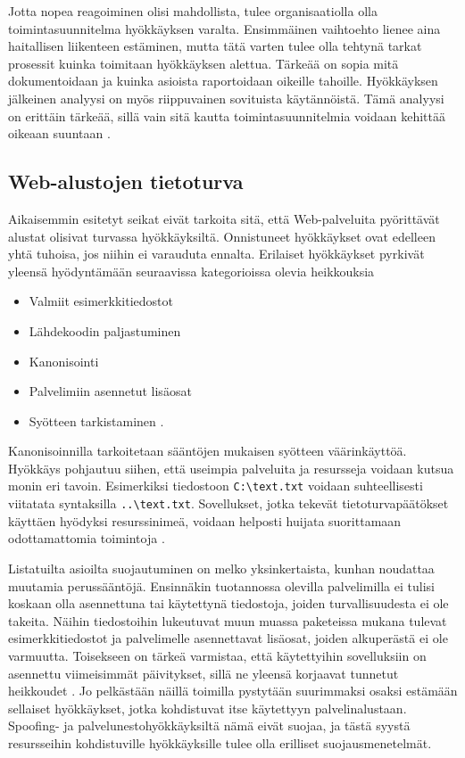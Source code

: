 Jotta nopea reagoiminen olisi mahdollista, tulee organisaatiolla olla
toimintasuunnitelma hyökkäyksen varalta. Ensimmäinen vaihtoehto lienee aina
haitallisen liikenteen estäminen, mutta tätä varten tulee olla tehtynä tarkat
prosessit kuinka toimitaan hyökkäyksen alettua. Tärkeää on sopia mitä
dokumentoidaan ja kuinka asioista raportoidaan oikeille tahoille. Hyökkäyksen
jälkeinen analyysi on myös riippuvainen sovituista käytännöistä. Tämä analyysi
on erittäin tärkeää, sillä vain sitä kautta toimintasuunnitelmia voidaan
kehittää oikeaan suuntaan \cite{DDOS}.

\subsection{Web-alustojen tietoturva}

Aikaisemmin esitetyt seikat eivät tarkoita sitä, että Web-palveluita pyörittävät alustat olisivat
turvassa hyökkäyksiltä. Onnistuneet hyökkäykset ovat edelleen yhtä tuhoisa, jos niihin ei varauduta ennalta.
Erilaiset hyökkäykset pyrkivät yleensä hyödyntämään seuraavissa kategorioissa olevia heikkouksia

\begin{itemize}
\item Valmiit esimerkkitiedostot
\item Lähdekoodin paljastuminen
\item Kanonisointi
\item Palvelimiin asennetut lisäosat
\item Syötteen tarkistaminen \cite{Hacking}.
\end{itemize}
Kanonisoinnilla tarkoitetaan sääntöjen mukaisen syötteen väärinkäyttöä. Hyökkäys pohjautuu siihen,
että useimpia palveluita ja resursseja voidaan kutsua monin eri
tavoin. Esimerkiksi tiedostoon \texttt{C:\textbackslash text.txt}
voidaan suhteellisesti viitatata syntaksilla \texttt{..\textbackslash text.txt}. Sovellukset, jotka tekevät tietoturvapäätökset käyttäen hyödyksi resurssinimeä,
voidaan helposti huijata suorittamaan odottamattomia toimintoja \cite{Hacking}.

Listatuilta asioilta suojautuminen on melko yksinkertaista, kunhan noudattaa muutamia perussääntöjä. Ensinnäkin tuotannossa 
olevilla palvelimilla ei tulisi koskaan olla asennettuna tai käytettynä tiedostoja, joiden turvallisuudesta ei ole
takeita. Näihin tiedostoihin lukeutuvat muun muassa paketeissa mukana tulevat esimerkkitiedostot ja palvelimelle asennettavat 
lisäosat, joiden alkuperästä ei ole varmuutta. Toisekseen on tärkeä varmistaa, että käytettyihin sovelluksiin
on asennettu viimeisimmät päivitykset, sillä ne yleensä korjaavat tunnetut heikkoudet \cite{Hacking}. Jo pelkästään näillä 
toimilla pystytään suurimmaksi osaksi estämään sellaiset hyökkäykset, jotka kohdistuvat itse käytettyyn palvelinalustaan.
Spoofing- ja palvelunestohyökkäyksiltä nämä eivät suojaa, ja tästä syystä resursseihin kohdistuville hyökkäyksille
tulee olla erilliset suojausmenetelmät.

